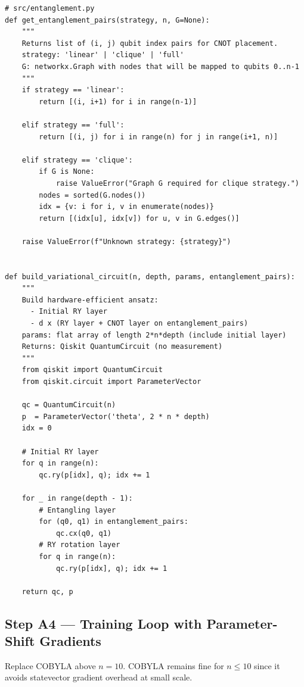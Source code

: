 \documentclass[11pt]{article}
\begin{document}
\begin{lstlisting}
# src/entanglement.py
def get_entanglement_pairs(strategy, n, G=None):
    """
    Returns list of (i, j) qubit index pairs for CNOT placement.
    strategy: 'linear' | 'clique' | 'full'
    G: networkx.Graph with nodes that will be mapped to qubits 0..n-1
    """
    if strategy == 'linear':
        return [(i, i+1) for i in range(n-1)]

    elif strategy == 'full':
        return [(i, j) for i in range(n) for j in range(i+1, n)]

    elif strategy == 'clique':
        if G is None:
            raise ValueError("Graph G required for clique strategy.")
        nodes = sorted(G.nodes())
        idx = {v: i for i, v in enumerate(nodes)}
        return [(idx[u], idx[v]) for u, v in G.edges()]

    raise ValueError(f"Unknown strategy: {strategy}")


def build_variational_circuit(n, depth, params, entanglement_pairs):
    """
    Build hardware-efficient ansatz:
      - Initial RY layer
      - d x (RY layer + CNOT layer on entanglement_pairs)
    params: flat array of length 2*n*depth (include initial layer)
    Returns: Qiskit QuantumCircuit (no measurement)
    """
    from qiskit import QuantumCircuit
    from qiskit.circuit import ParameterVector

    qc = QuantumCircuit(n)
    p  = ParameterVector('theta', 2 * n * depth)
    idx = 0

    # Initial RY layer
    for q in range(n):
        qc.ry(p[idx], q); idx += 1

    for _ in range(depth - 1):
        # Entangling layer
        for (q0, q1) in entanglement_pairs:
            qc.cx(q0, q1)
        # RY rotation layer
        for q in range(n):
            qc.ry(p[idx], q); idx += 1

    return qc, p
\end{lstlisting}

\subsection{Step A4 --- Training Loop with Parameter-Shift Gradients}

Replace COBYLA above $n=10$. COBYLA remains fine for $n \leq 10$
since it avoids statevector gradient overhead at small scale.
\end{document}
